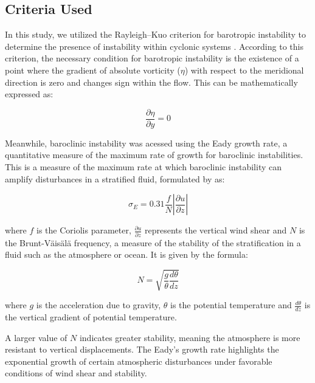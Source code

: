 \subsection{Criteria Used}\label{sec:method_criteria}

In this study, we utilized the Rayleigh–Kuo criterion for barotropic instability to determine the presence of instability within cyclonic systems \citep{rayleigh1895stability,kuo1949dynamic}. According to this criterion, the necessary condition for barotropic instability is the existence of a point where the gradient of absolute vorticity (\(\eta\)) with respect to the meridional direction is zero and changes sign within the flow. This can be mathematically expressed as:

\begin{equation}\label{eq:rayleigh_kuo_criteria}
    \frac{\partial \eta}{\partial y} = 0
\end{equation}

Meanwhile, baroclinic instability was acessed using the Eady growth rate, a quantitative measure of the maximum rate of growth for baroclinic instabilities. This is a measure of the maximum rate at which baroclinic instability can amplify disturbances in a stratified fluid, formulated by \citet{hoskins1990existence} as: 

\begin{equation}\label{eq:eady_geowth}
 \sigma_E = 0.31 \frac{f}{N} \left| \frac{\partial u}{\partial z} \right| 
\end{equation}

where \(f\) is the Coriolis parameter, \(\frac{\partial u}{\partial z}\) represents the vertical wind shear and \(N\) is the Brunt-Väisälä frequency, a measure of the stability of the stratification in a fluid such as the atmosphere or ocean. It is given by the formula:

\begin{equation}
N = \sqrt{\frac{g}{\theta} \frac{d\theta}{dz}}
\end{equation}

where \(g\) is the acceleration due to gravity, \(\theta\) is the potential temperature and \(\frac{d\theta}{dz}\) is the vertical gradient of potential temperature.

A larger value of \(N\) indicates greater stability, meaning the atmosphere is more resistant to vertical displacements. The Eady's growth rate highlights the exponential growth of certain atmospheric disturbances under favorable conditions of wind shear and stability.

